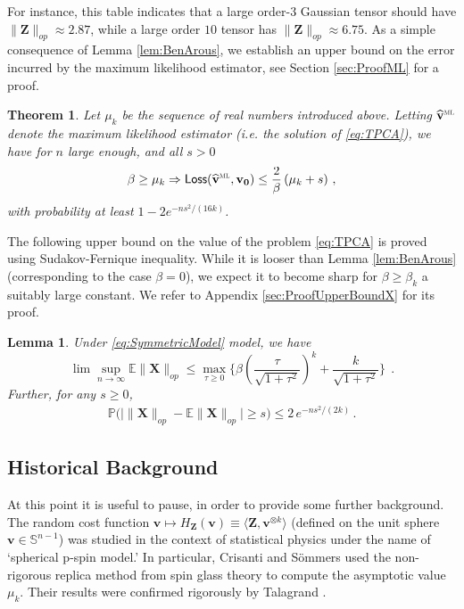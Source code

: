 \documentclass[11pt]{article}
\newtheorem{lemma}[claim]{Lemma}
\newtheorem{theorem}{Theorem}
\theoremstyle{definition}
\def\sML{\mbox{\tiny\sc ML}}
\def\Loss{{\sf Loss}}
\def\<{\langle}
\def\>{\rangle}
\def\prob{{\mathbb P}}
\def\E{{\mathbb E}} %
\def\bv{\mathbf{v}}
\def\hbv{\mathbf{\widehat{v}}}
\def\bvz{\mathbf{v_0}}
\def\bX{\mathbf{X}}
\def\bZ{\mathbf{Z}}
\def\bbS{\mathbb{S}}
\def\E{\mathbb{E}}
\def\ok{{^{\otimes k}}}
\begin{document}
For instance, this table indicates that a large order-$3$ Gaussian
tensor should have  $\|\bZ\|_{op}  \approx 2.87$, while a large
order $10$ tensor has $ \|\bZ\|_{op}   \approx 6.75$.
As a simple consequence of Lemma \ref{lem:BenArous}, we establish an
upper bound on the error incurred by the maximum likelihood estimator,
see Section \ref{sec:ProofML} for a proof.
%
\begin{theorem}\label{th:nonconvexOpt}
Let  $\mu_k$ be the sequence of real numbers introduced above. 
Letting $\hbv^{\sML}$  denote  the maximum likelihood
estimator (i.e. the solution of  \ref{eq:TPCA}), 
we have for $n$ large enough, and all $s>0$
%
\begin{align}
%
\beta\ge \mu_k \Rightarrow \Loss(\hbv^{\sML},\bvz)\le \frac{2}{\beta}  \left ( \mu_k +   s \right )\, ,
%
\end{align}
%
with probability at least $1- 2e^{-ns^2/(16 k)}$.
%
\end{theorem}

%
%
The following upper bound on the value of the problem \ref{eq:TPCA}
is proved using Sudakov-Fernique inequality. While it is looser than
Lemma \ref{lem:BenArous} (corresponding to the case
$\beta=0$), we expect it to become sharp for $\beta\ge \beta_k$ a
suitably large constant. We refer to Appendix
\ref{sec:ProofUpperBoundX} for its proof. 
%
\begin{lemma}\label{lem:upperBoundX}
Under \ref{eq:SymmetricModel} model, we have
\begin{equation}
\lim \sup_{n \to \infty} \E \|\bX\|_{op}   \leq \max_{\tau\ge 0} \Big\{\beta \left ( \frac {\tau}{\sqrt{1+\tau^2}} \right )^k +  \frac k{ \sqrt{1+\tau^2}}\Big\}~~.
\end{equation}
%
Further, for any $s\ge 0$,
%
\begin{align}
%
\prob\big(\big|\|\bX\|_{op}  -  \E \|\bX\|_{op}  \big|\ge s\big)\le 2\,
e^{-ns^2/(2k)}\, .
%
\end{align}
%
\end{lemma}
%

\subsection{Historical Background}

At this point it is useful to pause,  in order to provide some further background.
The random cost function $\bv\mapsto H_{\bZ}(\bv) \equiv
\<\bZ,\bv\ok\>$ (defined on the unit sphere $\bv\in \bbS^{n-1}$) was studied in the context of statistical physics
under the name of `spherical p-spin model.'
In particular, Crisanti and S\"ommers \cite{crisanti1992sphericalp} used the non-rigorous
replica method from spin glass theory to compute the asymptotic value
$\mu_k$.  Their results were confirmed rigorously by Talagrand
\cite{talagrand2006free}.
\end{document}
